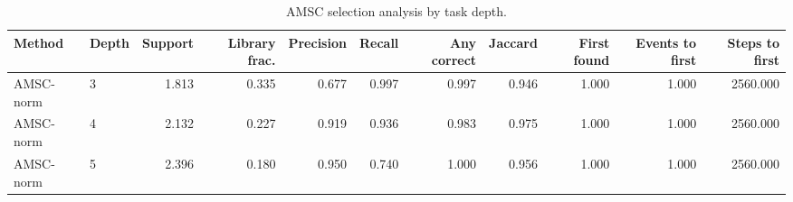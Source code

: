 \begin{table}[ht]
    \caption{AMSC selection analysis by task depth.}
    \label{tbl:amsc_selection_depth}
    \centering
    \scriptsize
    \begin{tabular}{llrrrrrrrrr}
    \toprule
Method & Depth & Support & Library frac. & Precision & Recall & Any correct & Jaccard & First found & Events to first & Steps to first \\
    \midrule
AMSC-norm & 3 & 1.813 & 0.335 & 0.677 & 0.997 & 0.997 & 0.946 & 1.000 & 1.000 & 2560.000 \\
AMSC-norm & 4 & 2.132 & 0.227 & 0.919 & 0.936 & 0.983 & 0.975 & 1.000 & 1.000 & 2560.000 \\
AMSC-norm & 5 & 2.396 & 0.180 & 0.950 & 0.740 & 1.000 & 0.956 & 1.000 & 1.000 & 2560.000 \\
    \bottomrule
    \end{tabular}
\end{table}
